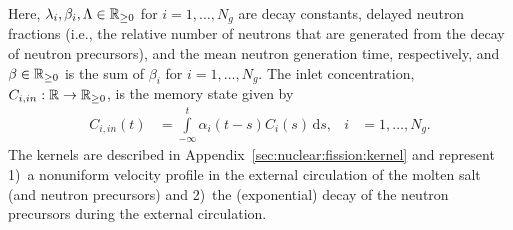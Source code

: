 %
Here, $\lambda_i, \beta_i, \Lambda \in \mathbb{R}_{\geq 0}$ for $i = 1, \ldots, N_g$ are decay constants, delayed neutron fractions (i.e., the relative number of neutrons that are generated from the decay of neutron precursors), and the mean neutron generation time, respectively, and $\beta \in \mathbb{R}_{\geq 0}$ is the sum of $\beta_i$ for $i = 1, \ldots, N_g$.
%
The inlet concentration, $C_{i, in}: \mathbb{R} \rightarrow \mathbb{R}_{\geq 0}$, is the memory state given by
%
\begin{align}\label{eq:nuclear:fission:delay}
	C_{i, in}(t) &= \int\limits_{-\infty}^t \alpha_i(t - s) C_i(s)\,\mathrm ds, & i &= 1, \ldots, N_g.
\end{align}
%
The kernels are described in Appendix~\ref{sec:nuclear:fission:kernel} and represent 1)~a nonuniform velocity profile in the external circulation of the molten salt (and neutron precursors) and 2)~the (exponential) decay of the neutron precursors during the external circulation.

